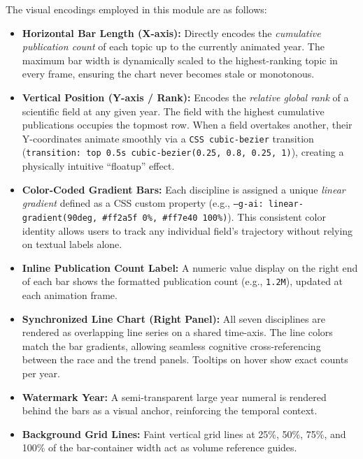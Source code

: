 \documentclass[12pt,a4paper]{article}
\begin{document}
The visual encodings employed in this module are as follows:

\begin{itemize}
    \item \textbf{Horizontal Bar Length (X-axis):} Directly encodes the \textit{cumulative
    publication count} of each topic up to the currently animated year. The maximum bar
    width is dynamically scaled to the highest-ranking topic in every frame, ensuring the
    chart never becomes stale or monotonous.

    \item \textbf{Vertical Position (Y-axis / Rank):} Encodes the \textit{relative global
    rank} of a scientific field at any given year. The field with the highest cumulative
    publications occupies the topmost row. When a field overtakes another, their
    Y-coordinates animate smoothly via a \texttt{CSS cubic-bezier} transition
    (\texttt{transition: top 0.5s cubic-bezier(0.25, 0.8, 0.25, 1)}), creating a
    physically intuitive ``floatup'' effect.

    \item \textbf{Color-Coded Gradient Bars:} Each discipline is assigned a unique
    \textit{linear gradient} defined as a CSS custom property (e.g.,
    \texttt{--g-ai: linear-gradient(90deg, \#ff2a5f 0\%, \#ff7e40 100\%)}). This
    consistent color identity allows users to track any individual field's trajectory
    without relying on textual labels alone.

    \item \textbf{Inline Publication Count Label:} A numeric value display on the right
    end of each bar shows the formatted publication count (e.g., \texttt{1.2M}),
    updated at each animation frame.

    \item \textbf{Synchronized Line Chart (Right Panel):} All seven disciplines are
    rendered as overlapping line series on a shared time-axis. The line colors match
    the bar gradients, allowing seamless cognitive cross-referencing between the race
    and the trend panels. Tooltips on hover show exact counts per year.

    \item \textbf{Watermark Year:} A semi-transparent large year numeral is rendered
    behind the bars as a visual anchor, reinforcing the temporal context.

    \item \textbf{Background Grid Lines:} Faint vertical grid lines at 25\%, 50\%,
    75\%, and 100\% of the bar-container width act as volume reference guides.
\end{itemize}
\end{document}
